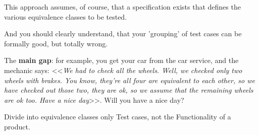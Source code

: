 This approach assumes, of course, that a specification exists that defines the various equivalence classes to be tested. 

And you should clearly understand, that your 'grouping' of test cases can be formally good, but totally wrong.

The \textbf{main gap}: for example, you get your car from the car service, and the mechanic says: <<\textit{We had to check all the wheels. Well, we checked only two wheels with brakes. You know, they're all four are equivalent to each other, so we have checked out those two, they are ok, so we \emph{assume} that the remaining wheels are ok too. Have a nice day}>>. Will you have a nice day?

Divide into equivalence classes only Test cases, not the Functionality of a product.